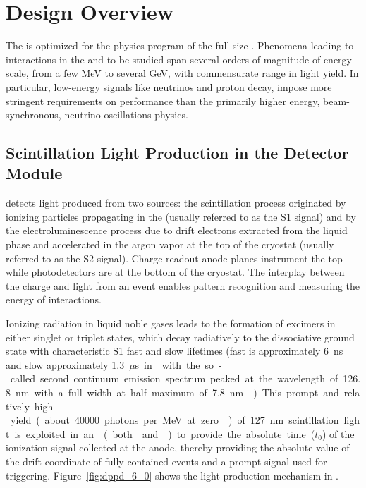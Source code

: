 \section{Design Overview}
\label{sec:dp-pds-overview}

The \dual {} is optimized for the physics program of the full-size \dune {}. Phenomena leading to interactions in the   and to be studied span several orders of magnitude of energy scale, from a few \si{MeV} to several \si{GeV}, with commensurate range in light yield. In particular, low-energy signals like  neutrinos and proton decay, impose more stringent requirements on  performance than the primarily higher energy, beam-synchronous, neutrino oscillations physics.



\subsection{Scintillation Light Production in the \dual Detector Module}
\label{sec:dp-pds-overview_scintillation}

\dual {} detects light produced from two sources: the scintillation process originated by ionizing particles propagating in the  (usually referred to as the S1 signal) and by the electroluminescence process due to drift electrons extracted from the liquid phase and accelerated in the argon vapor at the top of the cryostat (usually referred to as the S2 signal). Charge readout anode planes instrument the top while photodetectors are at the bottom of the cryostat. The interplay between the charge and light from an event enables pattern recognition and measuring the energy of interactions.

Ionizing radiation in liquid noble gases leads 
 to the formation of excimers in either singlet or triplet states, which decay radiatively to the dissociative ground state with characteristic S1 fast and slow lifetimes (fast is approximately \SI{6}{ns} and slow approximately \SI{1.3}{$\mu$s} in \lar with the so-called second continuum emission spectrum peaked at the wavelength of %
 \SI{126.8}{nm} with a full width at half maximum of \SI{7.8}{nm} \cite{Heindl}). This prompt and relatively high-yield (about \num{40000} photons per \si{MeV} at zero \efield) of \SI{127}{nm} scintillation light is exploited in an  (both  and ) to provide the absolute time ($t_0$) of the ionization signal collected at the anode, thereby providing the absolute value of the drift coordinate of fully contained events and a prompt signal used for triggering. Figure~\ref{fig:dppd_6_0} shows the light production mechanism in \lar.


